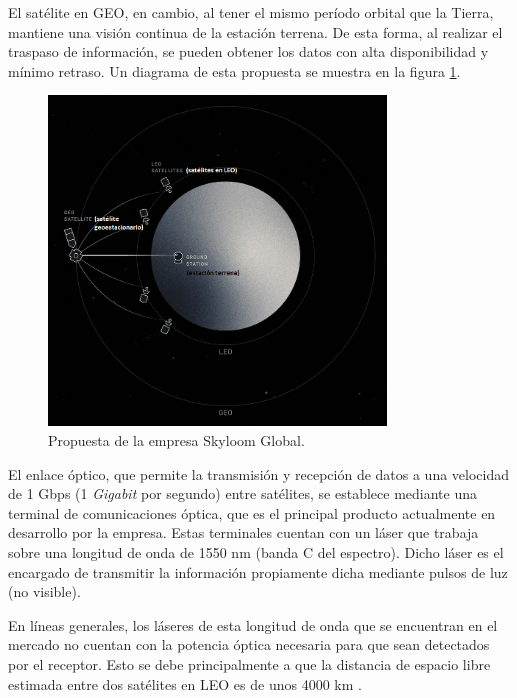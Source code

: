 El satélite en GEO, en cambio, al tener el mismo período orbital que la Tierra, mantiene una visión continua de la estación terrena. De esta forma, al realizar el traspaso de información, se pueden obtener los datos con alta disponibilidad y mínimo retraso. Un diagrama de esta propuesta se muestra en la figura \ref{fig:propSky}.

\begin{figure}[H]
\centering
\includegraphics[width=0.8\textwidth]{./Figures/propuesta_skyloom.png}
\caption{Propuesta de la empresa Skyloom Global\protect\footnotemark.}
\label{fig:propSky}
\end{figure}


El enlace óptico, que permite la transmisión y recepción de datos a una velocidad de 1 Gbps (1 \textit{Gigabit} por segundo) entre satélites, se establece mediante una terminal de comunicaciones óptica, que es el principal producto actualmente en desarrollo por la empresa. Estas terminales cuentan con un láser que trabaja sobre una longitud de onda de 1550 nm (banda C del espectro). Dicho láser es el encargado de transmitir la información propiamente dicha mediante pulsos de luz (no visible).

En líneas generales, los láseres de esta longitud de onda que se encuentran en el mercado no cuentan con la potencia óptica necesaria para que sean detectados por el receptor. Esto se debe principalmente a que la distancia de espacio libre estimada entre dos satélites en LEO es de unos 4000 km \citep{WEBSITE_SKY}.

